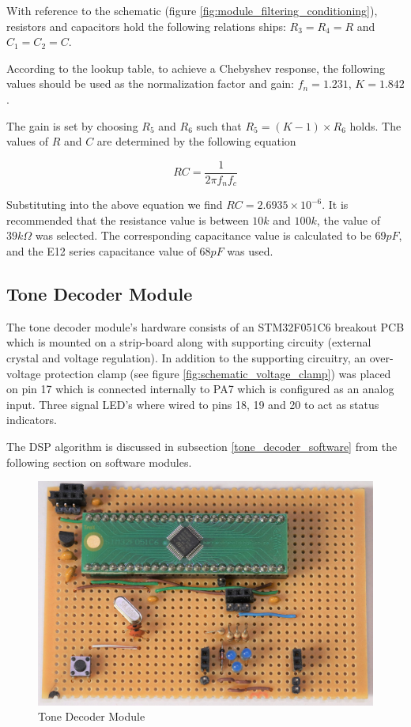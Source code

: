 With reference to the schematic (figure \ref{fig:module_filtering_conditioning}), resistors and capacitors hold the following relations ships: \(R_3 = R_4 = R\) and \(C_1 = C_2 = C\).

According to the lookup table, to achieve a Chebyshev response, the following values should be used as the normalization factor and gain: \(f_n = 1.231\), \(K = 1.842\).

The gain is set by choosing $R_5$ and $R_6$ such that \(R_5 = (K - 1) \times R_6\) holds. The values of $R$ and $C$ are determined by the following equation


\[RC = \frac{1}{2\pi f_n f_c}\]

Substituting into the above equation we find $RC = 2.6935\times 10^{-6}$. It is recommended that the resistance value is between $10k$ and $100k$, the value of $39k\Omega$ was selected. The corresponding capacitance value is calculated to be $69pF$, and the E12 series capacitance value of $68pF$ was used.








\subsection{Tone Decoder Module}

The tone decoder module's hardware consists of an STM32F051C6 breakout PCB which is mounted on a strip-board along with supporting circuity (external crystal and voltage regulation). In addition to the supporting circuitry, an over-voltage protection clamp (see figure \ref{fig:schematic_voltage_clamp}) was placed on pin 17 which is connected internally to PA7 which is configured as an analog input. Three signal LED's where wired to pins 18, 19 and 20 to act as status indicators.

The DSP algorithm is discussed in subsection \ref{tone_decoder_software} from the following section on software modules.


\begin{figure}[H]
	\centering
	\includegraphics[width=.6\textwidth]{figures/modules/goertzel_filter.jpg}
	\caption{Tone Decoder Module}
	\label{fig:module_tone_decoder}
\end{figure}




